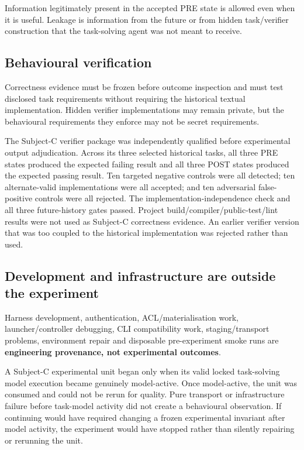 Information legitimately present in the accepted PRE state is allowed even when it is useful. Leakage is information from the future or from hidden task/verifier construction that the task-solving agent was not meant to receive.

\subsection{Behavioural verification}

Correctness evidence must be frozen before outcome inspection and must test disclosed task requirements without requiring the historical textual implementation. Hidden verifier implementations may remain private, but the behavioural requirements they enforce may not be secret requirements.

The Subject-C verifier package was independently qualified before experimental output adjudication. Across its three selected historical tasks, all three PRE states produced the expected failing result and all three POST states produced the expected passing result. Ten targeted negative controls were all detected; ten alternate-valid implementations were all accepted; and ten adversarial false-positive controls were all rejected. The implementation-independence check and all three future-history gates passed. Project build/compiler/public-test/lint results were not used as Subject-C correctness evidence. An earlier verifier version that was too coupled to the historical implementation was rejected rather than used.

\subsection{Development and infrastructure are outside the experiment}

Harness development, authentication, ACL/materialisation work, launcher/controller debugging, CLI compatibility work, staging/transport problems, environment repair and disposable pre-experiment smoke runs are \textbf{engineering provenance, not experimental outcomes}.

A Subject-C experimental unit began only when its valid locked task-solving model execution became genuinely model-active. Once model-active, the unit was consumed and could not be rerun for quality. Pure transport or infrastructure failure before task-model activity did not create a behavioural observation. If continuing would have required changing a frozen experimental invariant after model activity, the experiment would have stopped rather than silently repairing or rerunning the unit.

